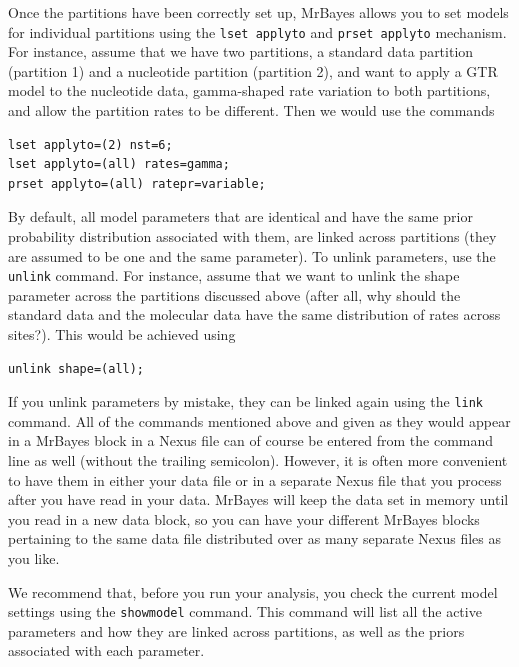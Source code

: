 \documentclass[12pt]{book}
\newcommand{\ttt}[1]{\texttt{#1}}
\begin{document}
Once the partitions have been correctly set up, MrBayes allows you to set models for individual
partitions using the \ttt{lset applyto} and \ttt{prset applyto} mechanism. For instance, assume
that we have two partitions, a standard data partition (partition 1) and a nucleotide partition
(partition 2), and want to apply a GTR model to the nucleotide data, gamma-shaped rate variation to
both partitions, and allow the partition rates to be different. Then we would use the commands

\begin{singlespacing}
\footnotesize
\begin{verbatim}
lset applyto=(2) nst=6;
lset applyto=(all) rates=gamma;
prset applyto=(all) ratepr=variable;
\end{verbatim}
\normalsize
\end{singlespacing}


By default, all model parameters that are identical and have the same prior probability
distribution associated with them, are linked across partitions (they are assumed to be one and the
same parameter). To unlink parameters, use the \ttt{unlink} command. For instance, assume that we
want to unlink the shape parameter across the partitions discussed above (after all, why should the
standard data and the molecular data have the same distribution of rates across sites?). This would
be achieved using

\begin{singlespacing}
\footnotesize
\begin{verbatim}
unlink shape=(all);
\end{verbatim}
\normalsize
\end{singlespacing}

If you unlink parameters by mistake, they can be linked again using the \ttt{link} command. All of
the commands mentioned above and given as they would appear in a MrBayes block in a Nexus file can
of course be entered from the command line as well (without the trailing semicolon). However, it is
often more convenient to have them in either your data file or in a separate Nexus file that you
process after you have read in your data. MrBayes will keep the data set in memory until you read
in a new data block, so you can have your different MrBayes blocks pertaining to the same data file
distributed over as many separate Nexus files as you like.

We recommend that, before you run your analysis, you check the current model settings using the
\ttt{showmodel} command. This command will list all the active parameters and how they are linked
across partitions, as well as the priors associated with each parameter.
\end{document}
